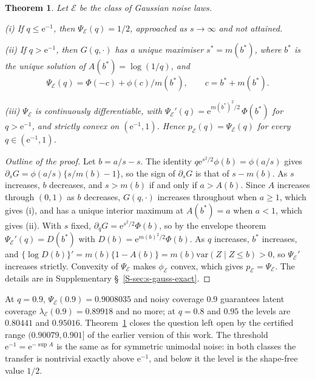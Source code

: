 \documentclass[12pt]{article}
\newtheorem{theorem}{Theorem}
\theoremstyle{definition}
\newcommand{\E}{\mathcal{E}}
\newcommand{\var}{\mathrm{var}}
\begin{document}
\begin{theorem}\label{thm:gauss}
Let $\E$ be the class of Gaussian noise laws.
\par\noindent (i) If $q \le \mathrm{e}^{-1}$, then $\Psi_{\E}(q) = 1/2$, approached as $s \to \infty$ and not attained.
\par\noindent (ii) If $q > \mathrm{e}^{-1}$, then $G(q, \cdot)$ has a unique maximiser $s^* = m(b^*)$, where $b^*$ is the unique solution of $A(b^*) = \log(1/q)$, and
\[
\Psi_{\E}(q) = \Phi(-c) + \phi(c)/m(b^*), \qquad c = b^* + m(b^*).
\]
\par\noindent (iii) $\Psi_{\E}$ is continuously differentiable, with $\Psi_{\E}'(q) = \mathrm{e}^{m(b^*)^2/2}\,\Phi(b^*)$ for $q > \mathrm{e}^{-1}$, and strictly convex on $(\mathrm{e}^{-1}, 1)$. Hence $p_{\E}(q) = \Psi_{\E}(q)$ for every $q \in (\mathrm{e}^{-1}, 1)$.
\end{theorem}

\begin{proof}[Outline of the proof]
Let $b = a/s - s$. The identity $q\mathrm{e}^{s^2/2}\phi(b) = \phi(a/s)$ gives $\partial_s G = \phi(a/s)\{s/m(b) - 1\}$, so the sign of $\partial_s G$ is that of $s - m(b)$. As $s$ increases, $b$ decreases, and $s > m(b)$ if and only if $a > A(b)$. Since $A$ increases through $(0, 1)$ as $b$ decreases, $G(q, \cdot)$ increases throughout when $a \ge 1$, which gives (i), and has a unique interior maximum at $A(b^*) = a$ when $a < 1$, which gives (ii). With $s$ fixed, $\partial_q G = \mathrm{e}^{s^2/2}\Phi(b)$, so by the envelope theorem $\Psi_{\E}'(q) = D(b^*)$ with $D(b) = \mathrm{e}^{m(b)^2/2}\Phi(b)$. As $q$ increases, $b^*$ increases, and $\{\log D(b)\}' = m(b)\{1 - A(b)\} = m(b)\var(Z \mid Z \le b) > 0$, so $\Psi_{\E}'$ increases strictly. Convexity of $\Psi_{\E}$ makes $\phi_{\E}$ convex, which gives $p_{\E} = \Psi_{\E}$. The details are in Supplementary \S~\ref{S-sec:s-gauss-exact}.
\end{proof}

At $q = 0.9$, $\Psi_{\E}(0.9) = 0.9008035$ and noisy coverage $0.9$ guarantees latent coverage $\lambda_{\E}(0.9) = 0.89918$ and no more; at $q = 0.8$ and $0.95$ the levels are $0.80441$ and $0.95016$. Theorem~\ref{thm:gauss} closes the question left open by the certified range $(0.90079, 0.901]$ of the earlier version of this work. The threshold $\mathrm{e}^{-1} = \mathrm{e}^{-\sup A}$ is the same as for symmetric unimodal noise: in both classes the transfer is nontrivial exactly above $\mathrm{e}^{-1}$, and below it the level is the shape-free value $1/2$.
\end{document}
